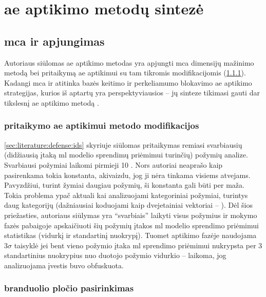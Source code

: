 \section{\gls{ae} aptikimo metodų sintezė}\label{sec:method}

\subsection{\gls{mca} ir \LIME apjungimas}
Autoriaus siūlomas \gls{ae} aptikimo metodas yra apjungti \gls{mca} dimensijų mažinimo metodą bei \LIME pritaikymą \gls{ae} aptikimui su tam tikromis modifikacijomis (\ref{sec:method:mods}). Kadangi \gls{mca} ir \LIME atitinka bazės keitimo  ir perkeliamumo blokavimo  \gls{ae} aptikimo strategijas, kurios iš aptartų yra perspektyviausios -- jų sinteze tikimasi gauti dar tikslesnį \gls{ae} aptikimo metodą .

\subsubsection{\LIME pritaikymo \gls{ae} aptikimui metodo modifikacijos}\label{sec:method:mods}
\ref{sec:literature:defense:ids} skyriuje siūlomas \LIME pritaikymas remiasi svarbiausių (didžiausią įtaką \gls{ml} modelio sprendimų priėmimui turinčių) požymių analize. Svarbiausi požymiai laikomi pirmieji 10 \cite{tcydenovaDetectionAdversarialAttacks2021}. Nors autoriai neaprašo kaip pasirenkama tokia konstanta, akivaizdu, jog ji nėra tinkama visiems atvejams. Pavyzdžiui, turint žymiai daugiau požymių, ši konstanta gali būti per maža. Tokia problema ypač aktuali kai analizuojami kategoriniai požymiai, turintys daug kategorijų (dažniausiai koduojami kaip dvejetainiai vektoriai -- ). Dėl šios priežasties, autoriaus siūlymas yra \enquote{svarbiais} laikyti visus požymius ir mokymo fazės pabaigoje apskaičiuoti šių požymių įtakos \gls{ml} modelio sprendimo priėmimui statistikas (vidurkį ir standartinį nuokrypį). Tuomet aptikimo fazėje naudojama $3 \sigma$ taisyklė \cite{pukelsheimThreeSigmaRule1994} \ty jei bent vieno požymio įtaka \gls{ml} sprendimo priėmimui nukrypsta per 3 standartinius nuokrypius nuo duotojo požymio vidurkio -- laikoma, jog analizuojama įvestis buvo obfuskuota.

\subsubsection{\LIME branduolio pločio pasirinkimas}


